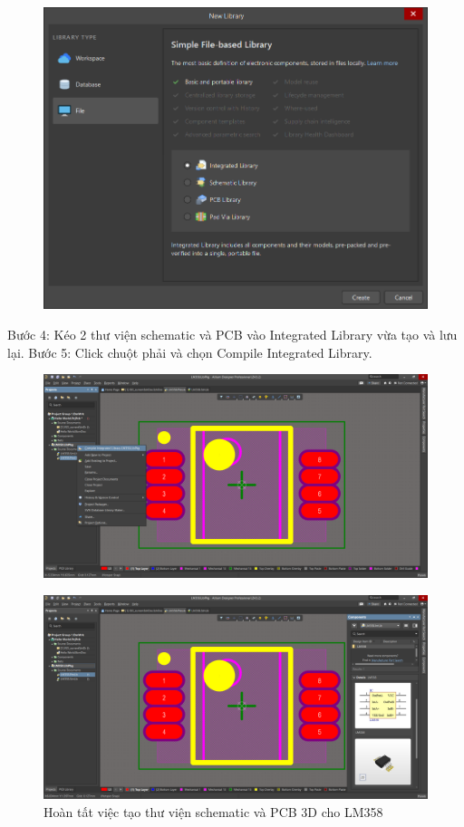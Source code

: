         \begin{figure}[H]
            \centering
            \includegraphics[width=1\textwidth]{pictures/ch3.15.png}
        \end{figure}
        Bước 4: Kéo 2 thư viện schematic và PCB vào Integrated Library vừa tạo và lưu lại. 
        Bước 5: Click chuột phải và chọn Compile Integrated Library.
        \begin{figure}[H]
            \centering
            \includegraphics[width=1\textwidth]{pictures/ch3.16.png}
        \end{figure}
        \begin{figure}[H]
            \centering
            \includegraphics[width=1\textwidth]{pictures/ch3.14.png}
            \caption{Hoàn tất việc tạo thư viện schematic và PCB 3D cho LM358} 
        \end{figure}
        \cleardoublepage